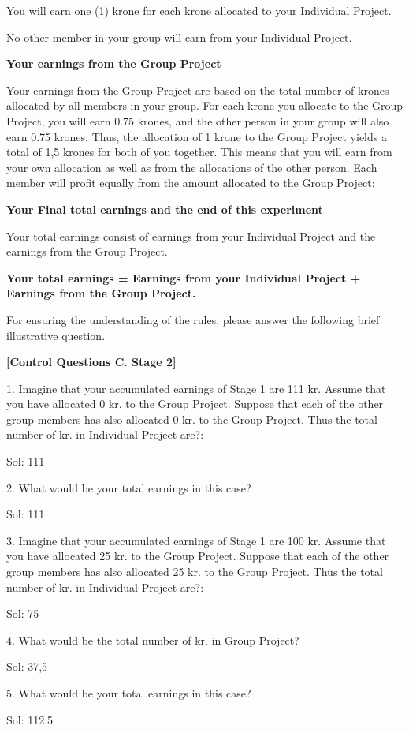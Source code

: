 \documentclass[a4paper, 12pt]{article}
\begin{document}
\begin{appendices}
You will earn one (1) krone for each krone allocated to your Individual Project. 

No other member in your group will earn from your Individual Project. 

\begin{center}
    \underline{\textbf{Your earnings from the Group Project}} 
\end{center}

Your earnings from the Group Project are based on the total number of krones allocated by all members in your group. For each krone you allocate to the Group Project, you will earn 0.75 krones, and the other person in your group will also earn 0.75 krones. Thus, the allocation of 1 krone to the Group Project yields a total of 1,5 krones for both of you together. This means that you will earn from your own allocation as well as from the allocations of the other person. Each member will profit equally from the amount allocated to the Group Project:

\begin{center}
    \underline{\textbf{Your Final total earnings and the end of this experiment}} 
\end{center}

Your total earnings consist of earnings from your Individual Project and the earnings from the Group Project.
\begin{center}
\textbf{Your total earnings = Earnings from your Individual Project + Earnings from the Group Project.}
\end{center}

For ensuring the understanding of the rules, please answer the following brief illustrative question.

\begin{center}
\textbf{[Control Questions C. Stage 2]}
\end{center}

1. Imagine that your accumulated earnings of Stage 1 are 111 kr. Assume that you have allocated 0 kr. to the Group Project. Suppose that each of the other group members has also allocated 0 kr. to the Group Project. Thus the total number of kr. in Individual Project are?:
\begin{center}
Sol: 111
\end{center}
2. What would be your total earnings in this case?
\begin{center}
Sol: 111
\end{center}
3. Imagine that your accumulated earnings of Stage 1 are 100 kr. Assume that you have allocated 25 kr. to the Group Project. Suppose that each of the other group members has also allocated 25 kr. to the Group Project. Thus the total number of kr. in Individual Project are?:
\begin{center}
Sol: 75
\end{center}
4. What would be the total number of kr. in Group Project?
\begin{center}
Sol: 37,5
\end{center}
5. What would be your total earnings in this case?
\begin{center}
Sol: 112,5
\end{center}


\end{appendices}
\end{document}
